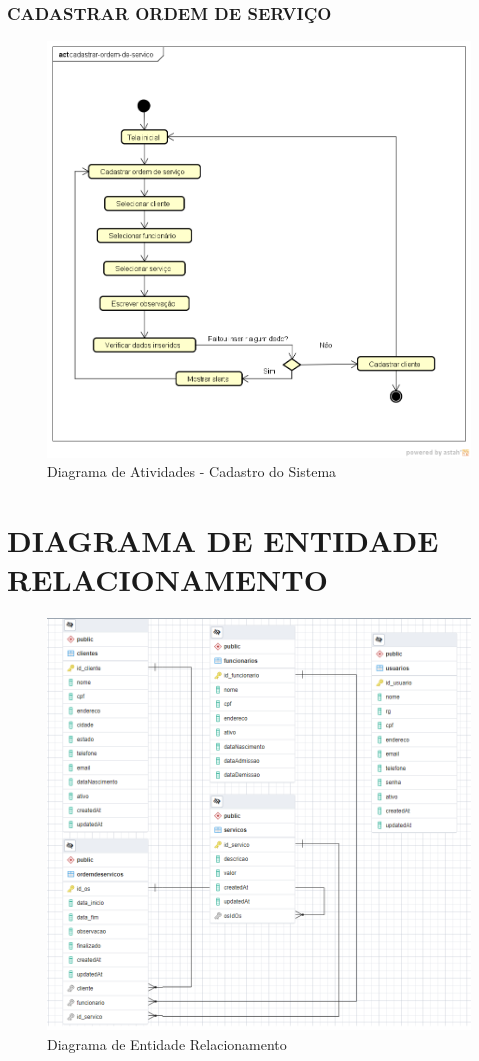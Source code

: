\subsubsection{CADASTRAR ORDEM DE SERVIÇO}
\begin{figure}[htb]
	\caption{\label{fig_cadastro} Diagrama de Atividades - Cadastro do Sistema}
	\begin{center}
	    \includegraphics[width=0.6\linewidth]{imagens/ordem-de-servico.png}
	\end{center}
\end{figure}

\newpage
\section{DIAGRAMA DE ENTIDADE RELACIONAMENTO}
\begin{figure}[htb]
	\caption{\label{fig_diagrama-erd} Diagrama de Entidade Relacionamento}
	\begin{center}
	    \includegraphics[width=0.8\linewidth]{imagens/diagrama_ERD.png}
	\end{center}
\end{figure}

